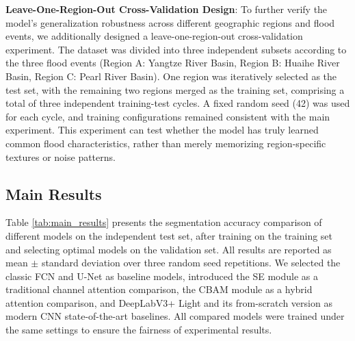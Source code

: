 \documentclass[lettersize,journal]{IEEEtran}
\begin{document}
\textbf{Leave-One-Region-Out Cross-Validation Design}: To further verify the model's generalization robustness across different geographic regions and flood events, we additionally designed a leave-one-region-out cross-validation experiment. The dataset was divided into three independent subsets according to the three flood events (Region A: Yangtze River Basin, Region B: Huaihe River Basin, Region C: Pearl River Basin). One region was iteratively selected as the test set, with the remaining two regions merged as the training set, comprising a total of three independent training-test cycles. A fixed random seed (42) was used for each cycle, and training configurations remained consistent with the main experiment. This experiment can test whether the model has truly learned common flood characteristics, rather than merely memorizing region-specific textures or noise patterns.

\subsection{Main Results}

Table \ref{tab:main_results} presents the segmentation accuracy comparison of different models on the independent test set, after training on the training set and selecting optimal models on the validation set. All results are reported as mean $\pm$ standard deviation over three random seed repetitions. We selected the classic FCN and U-Net as baseline models, introduced the SE module as a traditional channel attention comparison, the CBAM module as a hybrid attention comparison, and DeepLabV3+ Light and its from-scratch version as modern CNN state-of-the-art baselines. All compared models were trained under the same settings to ensure the fairness of experimental results.
\end{document}
